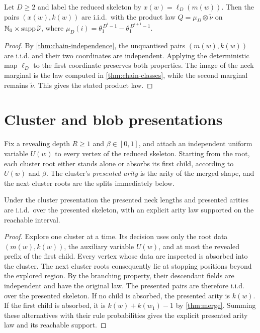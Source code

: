 \begin{proposition}
\label{thm:chain-product-form}
\leanok
Let $D\geq2$ and label the reduced skeleton by $x(w)=\ell_D(m(w))$. Then the pairs
$(x(w),k(w))$ are i.i.d.\ with the product law $Q=\mu_D\otimes\widetilde\nu$ on
$\mathbb{N}_0\times\operatorname{supp}\widetilde\nu$, where $\mu_D(i)=\theta_1^{\,D^i-1}-\theta_1^{\,D^{i+1}-1}$.
\end{proposition}

\begin{proof}
\leanok
{}
By \cref{thm:chain-independence}, the unquantised pairs $(m(w),k(w))$ are i.i.d. and their two
coordinates are independent. Applying the deterministic map $\ell_D$ to the first coordinate
preserves both properties. The image of the neck marginal is the law computed in
\cref{thm:chain-classes}, while the second marginal remains $\widetilde\nu$. This gives the
stated product law.
\end{proof}

\section{Cluster and blob presentations}

\begin{definition}
\label{def:cluster}
\leanok
{}
Fix a revealing depth $R\geq1$ and $\beta\in[0,1]$, and attach an independent uniform variable
$U(w)$ to every vertex of the reduced skeleton. Starting from the root, each cluster root either
stands alone or absorbs its first child, according to $U(w)$ and $\beta$. The cluster's
\emph{presented arity} is the arity of the merged shape, and the next cluster roots are the
splits immediately below.
\end{definition}

\begin{lemma}
\label{thm:cluster-law}
\leanok
{}
Under the cluster presentation the presented neck lengths and presented arities are i.i.d.\
over the presented skeleton, with an explicit arity law supported on the reachable interval.
\end{lemma}

\begin{proof}
\leanok
{}
Explore one cluster at a time. Its decision uses only the root data $(m(w),k(w))$, the auxiliary
variable $U(w)$, and at most the revealed prefix of the first child. Every vertex whose data are
inspected is absorbed into the cluster. The next cluster roots consequently lie at stopping
positions beyond the explored region. By the branching property, their descendant fields are
independent and have the original law. The presented pairs are therefore i.i.d. over the
presented skeleton. If no child is absorbed, the presented arity is $k(w)$. If the first child
is absorbed, it is $k(w)+k(w_1)-1$ by \cref{thm:merge}. Summing these alternatives with their
rule probabilities gives the explicit presented arity law and its reachable support.
\end{proof}

